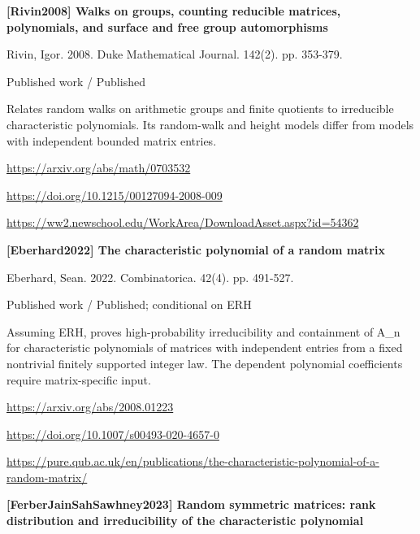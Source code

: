 \documentclass[11pt,a4paper,oneside,openany]{book}
\begin{document}
\vspace{9pt}
\hypertarget{ref:Rivin2008}{}
{\sffamily\bfseries\color{atlasgreen}[Rivin2008] Walks on groups, counting reducible matrices, polynomials, and surface and free group automorphisms}\par
\color{black} Rivin, Igor. 2008. Duke Mathematical Journal. 142(2). pp. 353-379.\par
{\small\sffamily\color{atlasgold}Published work / Published}\par
\color{black} Relates random walks on arithmetic groups and finite quotients to irreducible characteristic polynomials. Its random-walk and height models differ from models with independent bounded matrix entries.\par
{\footnotesize\url{https://arxiv.org/abs/math/0703532}}\par
{\footnotesize\url{https://doi.org/10.1215/00127094-2008-009}}\par
{\footnotesize\url{https://ww2.newschool.edu/WorkArea/DownloadAsset.aspx?id=54362}}\par
\vspace{9pt}
\hypertarget{ref:Eberhard2022}{}
{\sffamily\bfseries\color{atlasgreen}[Eberhard2022] The characteristic polynomial of a random matrix}\par
\color{black} Eberhard, Sean. 2022. Combinatorica. 42(4). pp. 491-527.\par
{\small\sffamily\color{atlasgold}Published work / Published; conditional on ERH}\par
\color{black} Assuming ERH, proves high-probability irreducibility and containment of A\_\allowbreak{}n for characteristic polynomials of matrices with independent entries from a fixed nontrivial finitely supported integer law. The dependent polynomial coefficients require matrix-specific input.\par
{\footnotesize\url{https://arxiv.org/abs/2008.01223}}\par
{\footnotesize\url{https://doi.org/10.1007/s00493-020-4657-0}}\par
{\footnotesize\url{https://pure.qub.ac.uk/en/publications/the-characteristic-polynomial-of-a-random-matrix/}}\par
\vspace{9pt}
\hypertarget{ref:FerberJainSahSawhney2023}{}
{\sffamily\bfseries\color{atlasgreen}[FerberJainSahSawhney2023] Random symmetric matrices: rank distribution and irreducibility of the characteristic polynomial}\par
\end{document}
